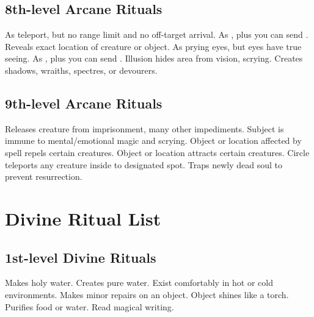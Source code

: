 \subsection{8th-level Arcane Rituals}
\begin{rituallist}
     As teleport, but no range limit and no off-target arrival.
     As , plus you can send .
     Reveals exact location of creature or object.
     As prying eyes, but eyes have true seeing.
     As , plus you can send .
     Illusion hides area from vision, scrying.
    \M Creates shadows, wraiths, spectres, or devourers.
\end{rituallist}

\subsection{9th-level Arcane Rituals}
\begin{rituallist}
     Releases creature from imprisonment, many other impediments.
     Subject is immune to mental/emotional magic and scrying.
     Object or location affected by spell repels certain creatures.
    \F Object or location attracts certain creatures.
     Circle teleports any creature inside to designated spot.
    \F Traps newly dead soul to prevent resurrection.
\end{rituallist}

\section{Divine Ritual List}
\subsection{1st-level Divine Rituals}
\begin{rituallist}
     Makes holy water.
     Creates pure water.
     Exist comfortably in hot or cold environments.
     Makes minor repairs on an object.
     Object shines like a torch.
     Purifies food or water.
     Read magical writing.
\end{rituallist}

